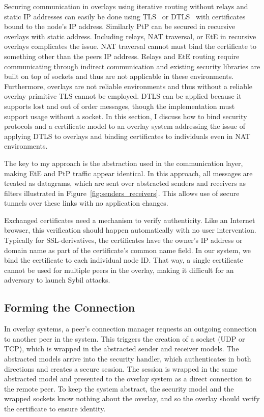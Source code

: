 Securing communication in overlays using iterative routing without relays and
static IP addresses can easily be done using TLS~\cite{tls} or DTLS~\cite{dtls}
with certificates bound to the node's IP address.  Similarly PtP can be secured
in recursive overlays with static address.  Including relays, NAT traversal, or
EtE in recursive overlays complicates the issue.  NAT traversal cannot must
bind the certificate to something other than the peers IP address. Relays and
EtE routing require communicating through indirect communication and existing
security libraries are built on top of sockets and thus are not applicable in
these environments.  Furthermore, overlays are not reliable environments and
thus without a reliable overlay primitive TLS cannot be employed.  DTLS can
be applied because it supports lost and out of order messages, though the
implementation must support usage without a socket.  In this section, I discuss
how to bind security protocols and a certificate model to an overlay system
addressing the issue of applying DTLS to overlays and binding certificates to
individuals even in NAT environments.

The key to my approach is the abstraction used in the communication layer,
making EtE and PtP traffic appear identical. In this approach, all messages
are treated as datagrams, which are sent over abstracted senders and receivers
as filters illustrated in Figure~\ref{fig:senders_receivers}.  This allows use
of secure tunnels over these links with no application changes.

Exchanged certificates need a mechanism to verify authenticity.  Like an
Internet browser, this verification should happen automatically with no user
intervention.  Typically for SSL-derivatives, the certificates have the owner's
IP address or domain name as part of the certificate's common name field.  In
our system, we bind the certificate to each individual node ID.  That way,
a single certificate cannot be used for multiple peers in the overlay, making
it difficult for an adversary to launch Sybil attacks.

\subsection{Forming the Connection}
In overlay systems, a peer's connection manager requests an outgoing
connection to another peer in the system.  This triggers the creation of a
socket (UDP or TCP), which is wrapped in the abstracted sender and receiver
models.  The abstracted models arrive into the security handler, which
authenticates in both directions and creates a secure session.  The session is
wrapped in the same abstracted model and presented to the overlay system as a
direct connection to the remote peer.  To keep the system abstract, the security
model and the wrapped sockets know nothing about the overlay, and so the overlay
should verify the certificate to ensure identity.

